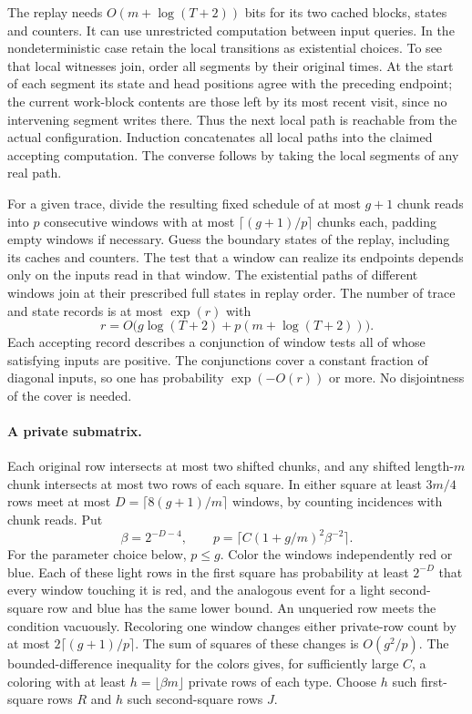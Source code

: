 \documentclass[11pt]{article}
\begin{document}
The replay needs $O(m+\log(T+2))$ bits for its two cached blocks, states and counters. It can use unrestricted computation between input queries. In the nondeterministic case retain the local transitions as existential choices. To see that local witnesses join, order all segments by their original times. At the start of each segment its state and head positions agree with the preceding endpoint; the current work-block contents are those left by its most recent visit, since no intervening segment writes there. Thus the next local path is reachable from the actual configuration. Induction concatenates all local paths into the claimed accepting computation. The converse follows by taking the local segments of any real path.

For a given trace, divide the resulting fixed schedule of at most $g+1$ chunk reads into $p$ consecutive windows with at most $\lceil(g+1)/p\rceil$ chunks each, padding empty windows if necessary. Guess the boundary states of the replay, including its caches and counters. The test that a window can realize its endpoints depends only on the inputs read in that window. The existential paths of different windows join at their prescribed full states in replay order. The number of trace and state records is at most $\exp(r)$ with
\[
 r=O\bigl(g\log(T+2)+p(m+\log(T+2))\bigr).
\]
Each accepting record describes a conjunction of window tests all of whose satisfying inputs are positive. The conjunctions cover a constant fraction of diagonal inputs, so one has probability $\exp(-O(r))$ or more. No disjointness of the cover is needed.

\paragraph{A private submatrix.}
Each original row intersects at most two shifted chunks, and any shifted length-$m$ chunk intersects at most two rows of each square. In either square at least $3m/4$ rows meet at most $D=\lceil8(g+1)/m\rceil$ windows, by counting incidences with chunk reads. Put
\[
 \beta=2^{-D-4},\qquad p=\lceil C(1+g/m)^2\beta^{-2}\rceil .
\]
For the parameter choice below, $p\le g$. Color the windows independently red or blue. Each of these light rows in the first square has probability at least $2^{-D}$ that every window touching it is red, and the analogous event for a light second-square row and blue has the same lower bound. An unqueried row meets the condition vacuously. Recoloring one window changes either private-row count by at most $2\lceil(g+1)/p\rceil$. The sum of squares of these changes is $O(g^2/p)$. The bounded-difference inequality for the colors gives, for sufficiently large $C$, a coloring with at least $h=\lfloor\beta m\rfloor$ private rows of each type. Choose $h$ such first-square rows $R$ and $h$ such second-square rows $J$.
\end{document}
